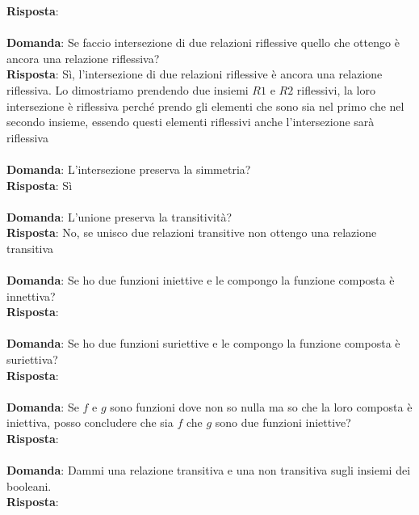 \documentclass{article}
\begin{document}
\textbf{Risposta}: \\ \\
\textbf{Domanda}: Se faccio intersezione di due relazioni riflessive quello che ottengo è ancora una relazione riflessiva? \\
\textbf{Risposta}: Sì, l'intersezione di due relazioni riflessive è ancora una relazione riflessiva. Lo dimostriamo prendendo due insiemi $R1$ e $R2$ riflessivi, la loro intersezione è riflessiva perché prendo gli elementi che sono sia nel primo che nel secondo insieme, essendo questi elementi riflessivi anche l'intersezione sarà riflessiva \\ \\
\textbf{Domanda}: L'intersezione preserva la simmetria? \\
\textbf{Risposta}: Sì \\ \\
\textbf{Domanda}: L'unione preserva la transitività? \\
\textbf{Risposta}: No, se unisco due relazioni transitive non ottengo una relazione transitiva \\ \\
\textbf{Domanda}: Se ho due funzioni iniettive e le compongo la funzione composta è innettiva? \\
\textbf{Risposta}: \\ \\
\textbf{Domanda}: Se ho due funzioni suriettive e le compongo la funzione composta è suriettiva? \\
\textbf{Risposta}: \\ \\
\textbf{Domanda}: Se $f$ e $g$ sono funzioni dove non so nulla ma so che la loro composta è iniettiva, posso concludere che sia $f$ che $g$ sono due funzioni iniettive? \\
\textbf{Risposta}: \\ \\
\textbf{Domanda}: Dammi una relazione transitiva e una non transitiva sugli insiemi dei booleani. \\
\textbf{Risposta}: \\ \\
\end{document}
